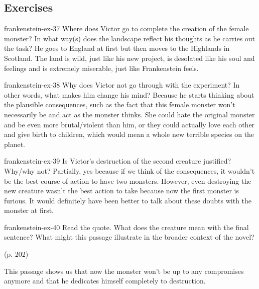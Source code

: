 \documentclass[preview]{standalone}
\begin{document}
\genpage

\subsection{Exercises}

\begin{snippetexercise}{frankenstein-ex-37}
    {Where does Victor go to complete the creation of the female monster? In what way(s) does the
    landscape reflect his thoughts as he carries out the task?}
    He goes to England at first but then moves to the Highlands in Scotland.
    The land is wild, just like his new project, is desolated like his soul
    and feelings and is extremely miserable, just like Frankenstein feels.
\end{snippetexercise}

\begin{snippetexercise}{frankenstein-ex-38}
    {Why does Victor not go through with the experiment? In other words, what makes him change
    his mind?}
    Because he starts thinking about the plausible consequences, such as the fact
    that this female monster won't necessarily be and act as the monster thinks.
    She could hate the original monster and be even more brutal/violent than him,
    or they could actually love each other and give birth to children, which
    would mean a whole new terrible species on the planet.
\end{snippetexercise}

\begin{snippetexercise}{frankenstein-ex-39}
    {Is Victor's destruction of the second creature justified? Why/why not?}
    Partially, yes because if we think of the consequences, it wouldn't be the best
    course of action to have two monsters. However, even destroying the new creature
    wasn't the best action to take because now the first monster is furious.
    It would definitely have been better to talk about these doubts with the monster
    at first. 
\end{snippetexercise}

\begin{snippetexercise}{frankenstein-ex-40}
    {Read the quote. What does the creature mean with the final sentence? What might this passage
    illustrate in the broader context of the novel?}
    \begin{center}
         (p. 202)
    \end{center}
    This passage shows us that now the monster won't be up to any compromises
    anymore and that he dedicates himself completely to destruction.
\end{snippetexercise}
\end{document}
